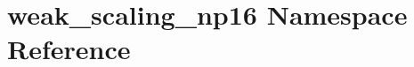 \hypertarget{namespaceweak__scaling__np16}{}\section{weak\+\_\+scaling\+\_\+np16 Namespace Reference}
\label{namespaceweak__scaling__np16}
